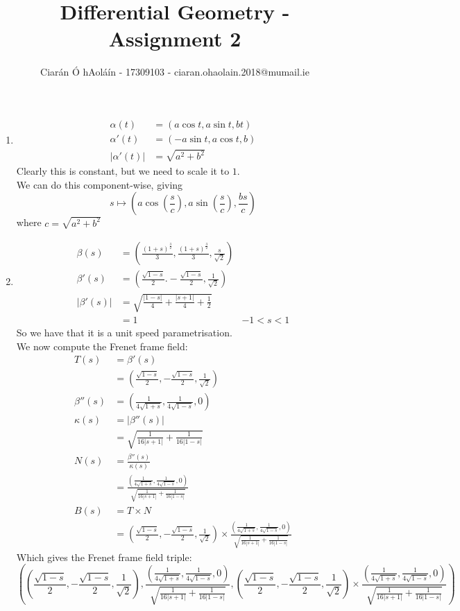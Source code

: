 \documentclass{article}
\title{Differential Geometry - Assignment 2}
\author{Ciarán Ó hAoláín - 17309103 - ciaran.ohaolain.2018@mumail.ie}
\newcommand{\abs}[1]{\left|#1\right|}
\theoremstyle{definition}
\theoremstyle{remark}
\theoremstyle{example}
\begin{document}
	\maketitle
	\begin{enumerate}
		\item \begin{align*}
			\alpha(t) &= (a \cos t, a \sin t, bt)\\
			\alpha'(t) &= (-a \sin t, a \cos t, b)\\
			\abs{\alpha'(t)} & = \sqrt{a^2 + b^2}
		\end{align*}
		Clearly this is constant, but we need to scale it to $1$.\\
		We can do this component-wise, giving \[ s \mapsto \left( a \cos \left(\frac{s}{c}\right), a \sin \left(\frac{s}{c}\right), \frac{bs}{c} \right) \] where $c = \sqrt{a^2+b^2}$
		\pagebreak
		\item \begin{align*}
			\beta(s)&=\left( \frac{(1+s)^\frac{3}{2}}{3},\frac{(1+s)^\frac{3}{2}}{3},\frac{s}{\sqrt{2}} \right)\\
			\beta'(s)&=\left(\frac{\sqrt{1-s}}{2}. -\frac{\sqrt{1-s}}{2}, \frac{1}{\sqrt{2}}\right)\\
			\abs{\beta'(s)}&=\sqrt{\frac{\abs{1-s}}{4}+\frac{\abs{s+1}}{4} + \frac{1 }{2}}\\
			& = 1 & -1 < s < 1
		\end{align*}
		So we have that it is a unit speed parametrisation.\\
		We now compute the Frenet frame field:
		\begin{align*}
			T(s)&=\beta'(s)\\
			&=\left(\frac{\sqrt{1-s}}{2}, -\frac{\sqrt{1-s}}{2}, \frac{1}{\sqrt{2}}\right)\\
			\beta''(s)&=\left( \frac{1}{4\sqrt{1+s}} , \frac{1}{4\sqrt{1-s}},0 \right)\\
			\kappa(s)&=\abs{\beta''(s)}\\
			&=\sqrt{\frac{1}{16\abs{s+1}}+\frac{1}{16\abs{1-s}}}\\
			N(s)&=\frac{\beta''(s)}{\kappa(s)}\\
			&=\frac{\left( \frac{1}{4\sqrt{1+s}} , \frac{1}{4\sqrt{1-s}},0 \right)}{\sqrt{\frac{1}{16\abs{s+1}}+\frac{1}{16\abs{1-s}}}}\\
			B(s)&=T \times N\\
			&=\left(\frac{\sqrt{1-s}}{2}, -\frac{\sqrt{1-s}}{2}, \frac{1}{\sqrt{2}}\right) \times \frac{\left( \frac{1}{4\sqrt{1+s}} , \frac{1}{4\sqrt{1-s}},0 \right)}{\sqrt{\frac{1}{16\abs{s+1}}+\frac{1}{16\abs{1-s}}}}
		\end{align*}
		Which gives the Frenet frame field triple: \[ \left( \left(\frac{\sqrt{1-s}}{2}, -\frac{\sqrt{1-s}}{2}, \frac{1}{\sqrt{2}}\right), \frac{\left( \frac{1}{4\sqrt{1+s}} , \frac{1}{4\sqrt{1-s}},0 \right)}{\sqrt{\frac{1}{16\abs{s+1}}+\frac{1}{16\abs{1-s}}}},  \left(\frac{\sqrt{1-s}}{2}, -\frac{\sqrt{1-s}}{2}, \frac{1}{\sqrt{2}}\right) \times \frac{\left( \frac{1}{4\sqrt{1+s}} , \frac{1}{4\sqrt{1-s}},0 \right)}{\sqrt{\frac{1}{16\abs{s+1}}+\frac{1}{16\abs{1-s}}}} \right) \]
		

\end{enumerate}
\end{document}
